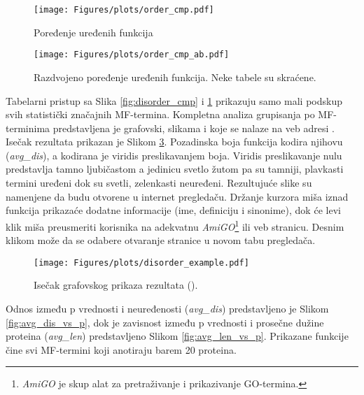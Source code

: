 \begin{figure}[th]
\hspace*{-1.0cm} 
  \centering
\texttt{[image: Figures/plots/order\_cmp.pdf]}
\caption {
  Poređenje uređenih funkcija
}
\label{fig:order_cmp}
\end{figure}

\begin{figure}[th]
\centering
\texttt{[image: Figures/plots/order\_cmp\_ab.pdf]}
\caption {
  Razdvojeno poređenje uređenih funkcija. Neke tabele su skraćene.
}
\label{fig:order_cmp_ab}
\end{figure}


\clearpage

Tabelarni pristup sa Slika \ref{fig:disorder_cmp} i \ref{fig:order_cmp}
prikazuju samo mali podskup svih statistički značajnih MF-termina.  Kompletna
analiza grupisanja po MF-terminima predstavljena je grafovski, slikama
 i  koje se nalaze na veb adresi
\cite{rezultati}.  Isečak rezultata  prikazan
je Slikom \ref{fig:disorder_example}.  Pozadinska boja funkcija kodira njihovu
 (\textit{avg\_dis}), a kodirana je viridis \cite{viridis} preslikavanjem
boja. Viridis preslikavanje nulu predstavlja tamno ljubičastom a jedinicu svetlo
žutom pa su tamniji, plavkasti termini  uređeni dok su svetli, zelenkasti
neuređeni.  Rezultujuće  slike su namenjene da budu otvorene u
internet pregledaču.  Držanje kurzora miša iznad funkcija prikazaće dodatne
informacije (ime, definiciju i sinonime), dok će levi klik miša preusmeriti
korisnika na adekvatnu \textit{AmiGO}\footnote{\textit{AmiGO} je skup alat za
pretraživanje i prikazivanje GO-termina.} ili \uniprot veb stranicu. Desnim
klikom može da se odabere otvaranje stranice u novom tabu pregledača.

\begin{figure}[th]
  \centering
\texttt{[image: Figures/plots/disorder\_example.pdf]}
\caption {
  Isečak grafovskog prikaza rezultata ().
}
\label{fig:disorder_example}
\end{figure}


Odnos između p vrednosti i neuređenosti (\textit{avg\_dis}) predstavljeno
je Slikom \ref{fig:avg_dis_vs_p}, dok je zavisnost između p vrednosti i
prosečne dužine proteina (\textit{avg\_len}) predstavljeno Slikom
\ref{fig:avg_len_vs_p}. Prikazane funkcije čine svi MF-termini koji anotiraju
barem 20 proteina.

